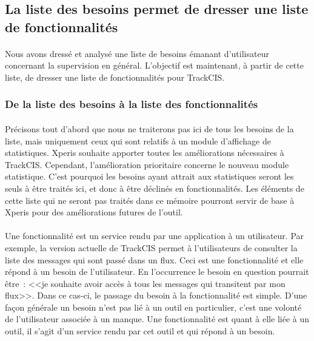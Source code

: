 	\subsection{La liste des besoins permet de dresser une liste de fonctionnalités}
		\paragraph{}%
		Nous avons dressé et analysé une liste de besoins émanant d'utilisateur
		concernant la supervision en général. L'objectif est maintenant, à partir de
		cette liste, de dresser une liste de fonctionnalités pour TrackCIS.
		
		\subsubsection{De la liste des besoins à la liste des fonctionnalités}
			\paragraph{}%
			Précisons tout d'abord que nous ne traiterons pas ici de tous les besoins de la
			liste, mais uniquement ceux qui sont relatifs à un module d'affichage de
			statistiques. Xperis souhaite apporter toutes les améliorations nécessaires à
			TrackCIS. Cependant, l'amélioration prioritaire concerne le nouveau module
			statistique. C'est pourquoi les besoins ayant attrait aux statistiques seront
			les seuls à être traités ici, et donc à être déclinés en
			fonctionnalités.\newline
			Les éléments de cette liste qui ne seront pas traités dans ce mémoire
			pourront servir de base à Xperis pour des améliorations futures de l'outil.
		
			\paragraph{}%
			Une fonctionnalité est un service rendu par une application à un utilisateur.
			Par exemple, la version actuelle de TrackCIS permet à l'utilisateurs de
			consulter la liste des messages qui sont passé dans un flux. Ceci est une
			fonctionnalité et elle répond à un besoin de l'utilisateur. En l'occurrence
			le besoin en question pourrait être~: <<je souhaite avoir accès à tous les messages
			qui transitent par mon flux>>.
			Dans ce cas-ci, le passage du besoin à la fonctionnalité est simple. D’une
			façon générale un besoin n'est pas lié à un outil en particulier, c'est une
			volonté de l'utilisateur associée à un manque.
			Une fonctionnalité est quant à elle liée à un outil, il
			s'agit d'un service rendu par cet outil et qui répond à un besoin.
		
